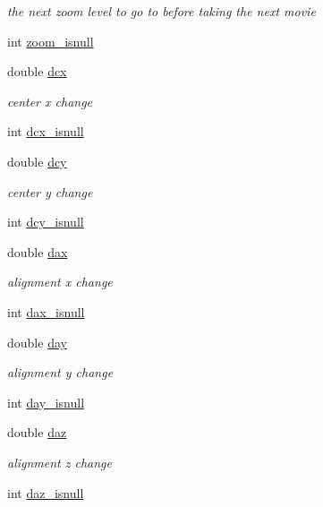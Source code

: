 \begin{DoxyCompactItemize}
\begin{DoxyCompactList}\small\item\em the next zoom level to go to before taking the next movie \item\end{DoxyCompactList}\item 
int \hyperlink{structlspg__getcenter__struct_a6ca85a8de29039188357b2814acd7803}{zoom\_\-isnull}
\item 
double \hyperlink{structlspg__getcenter__struct_ade0534056296e9ed568404c538be9227}{dcx}
\begin{DoxyCompactList}\small\item\em center x change \item\end{DoxyCompactList}\item 
int \hyperlink{structlspg__getcenter__struct_aa404da85af654998f039c81a77626748}{dcx\_\-isnull}
\item 
double \hyperlink{structlspg__getcenter__struct_a55b1a488b714e6a40d8e06a6e182bd0a}{dcy}
\begin{DoxyCompactList}\small\item\em center y change \item\end{DoxyCompactList}\item 
int \hyperlink{structlspg__getcenter__struct_a352c48c8d443c52f18ebd13019d01684}{dcy\_\-isnull}
\item 
double \hyperlink{structlspg__getcenter__struct_a17db52848c28852a470222ec93ae8886}{dax}
\begin{DoxyCompactList}\small\item\em alignment x change \item\end{DoxyCompactList}\item 
int \hyperlink{structlspg__getcenter__struct_a621b489777d61e9db8b33b784b8d70f9}{dax\_\-isnull}
\item 
double \hyperlink{structlspg__getcenter__struct_a9ce0f29540f2ff47be9788565d19f1b8}{day}
\begin{DoxyCompactList}\small\item\em alignment y change \item\end{DoxyCompactList}\item 
int \hyperlink{structlspg__getcenter__struct_a36f57a319288810caf365cca7827ff96}{day\_\-isnull}
\item 
double \hyperlink{structlspg__getcenter__struct_a1170bab2161f03ab29c39f79519ed9ae}{daz}
\begin{DoxyCompactList}\small\item\em alignment z change \item\end{DoxyCompactList}\item 
int \hyperlink{structlspg__getcenter__struct_a36742b6bd0f4bf9356414930ba893617}{daz\_\-isnull}
\end{DoxyCompactItemize}


